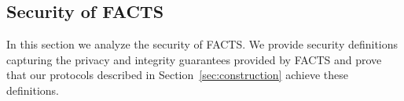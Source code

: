 \subsection{Security of FACTS}\label{sec:proofs}
In this section we analyze the security of FACTS.  We provide security definitions capturing the privacy and integrity guarantees provided by FACTS and prove that our protocols described in Section~\ref{sec:construction} achieve these definitions.

    

